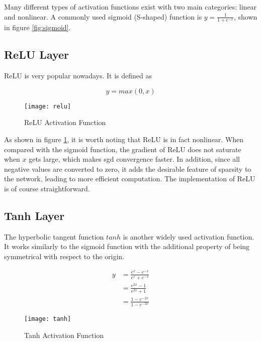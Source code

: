 Many different types of activation functions exist with two main categories: linear and nonlinear. A commonly
used sigmoid (S-shaped) function is $y = \frac{1}{1 + e^{-x}}$, shown in figure \ref{fig:sigmoid}.

\subsection{ReLU Layer}

ReLU is very popular nowadays. It is defined as

\begin{equation} \label{eq:relu}
  y = max(0, x)
\end{equation}

\begin{figure}[h]
  \centering
  \texttt{[image: relu]}
  \caption{ReLU Activation Function}
  \label{fig:relu}
\end{figure}

As shown in figure \ref{fig:relu}, it is worth noting that ReLU is in fact nonlinear. When compared
with the sigmoid function, the
gradient of ReLU does not saturate when $x$ gets large, which makes \gls{sgd} convergence faster. In addition,
since all negative values are converted to zero, it adds the desirable feature of sparsity to the network,
leading to more efficient computation. The implementation of ReLU is of course straightforward.

\subsection{Tanh Layer}

The hyperbolic tangent function $tanh$ is another widely used activation function. It works similarly to the
sigmoid function with the additional property of being symmetrical with respect to the origin.

\begin{equation} \label{eq:tanh}
  \begin{split}
    y & = \frac{e^x - e^{-x}}{e^{x} + e^{-x}} \\
      & = \frac{e^{2x} - 1}{e^{2x} + 1} \\
      & = \frac{1- e^{-2x}}{1 - e^{-2x}}
  \end{split}
\end{equation}

\begin{figure}[h]
  \centering
  \texttt{[image: tanh]}
  \caption{Tanh Activation Function}
  \label{fig:tanh}
\end{figure}

\clearpage %
